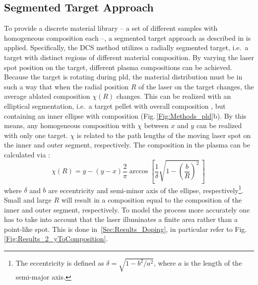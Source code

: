 \subsection{Segmented Target Approach}\label{Sec:Methods_VCCS}
To provide a discrete material library -- a set of different samples with homogeneous composition each --, a segmented target approach as described in \textcite{wenckstern2020} is applied.
Specifically, the \gls{DCS} method utilizes a radially segmented target, i.e.\ a target with distinct regions of different material composition.
By varying the laser spot position on the target, different plasma compositions can be achieved.
Because the target is rotating during \gls{pld}, the material distribution must be in such a way that when the radial position $R$ of the laser on the target changes, the average ablated composition $\chi(R)$ changes.
This can be realized with an elliptical segmentation, i.e.\ a target pellet with overall composition , but containing an inner ellipse with composition  (Fig.\,\ref{Fig:Methods_pld}b).
By this means, any homogeneous composition  with $\chi$ between $x$ and $y$ can be realized with only one target.
$\chi$ is related to the path lengths of the moving laser spot on the inner and outer segment, respectively.
The composition in the plasma can be calculated via \cite{wenckstern2020}:
\begin{equation}\label{Equ:Methods_composition}
    \chi(R) = y-(y-x)\frac{2}{\pi}\arccos\left[\frac{1}{\delta}\sqrt{1-\left(\frac{b}{R}\right)^2}\,\right]\,
\end{equation}
where $\delta$ and $b$ are eccentricity and semi-minor axis of the ellipse, respectively\footnote{
    The eccentricity is defined as $\delta=\sqrt{1-b^2/a^2}$, where $a$ is the length of the semi-major axis.
}.
Small and large $R$ will result in a composition equal to the composition of the inner and outer segment, respectively.
To model the process more accurately one has to take into account that the laser illuminates a finite area rather than a point-like spot.
This is done in~\ref{Sec:Results_Doping}, in particular refer to Fig.\,\ref{Fig:Results_2_yToComposition}. 